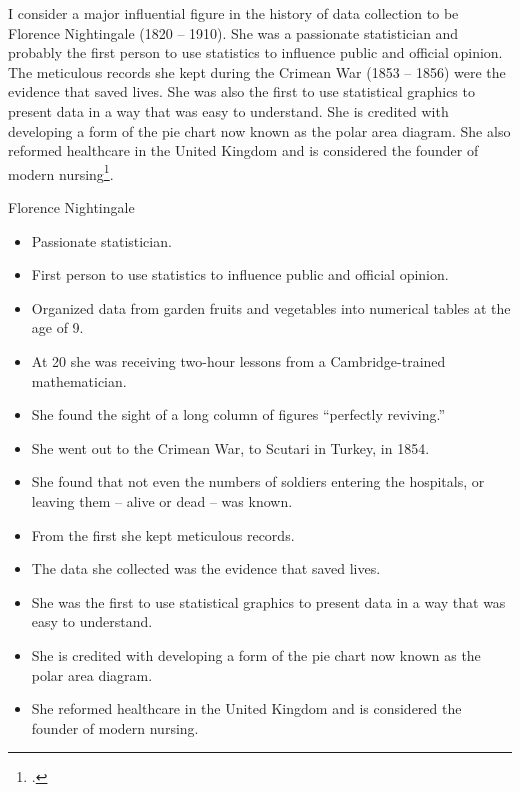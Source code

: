 I consider a major influential figure in the history of data
collection to be Florence Nightingale (1820 -- 1910).  She was a passionate statistician
and probably the first person to use statistics to influence public and official
opinion.  The meticulous records she kept during the Crimean War
(1853 -- 1856) were the evidence that saved lives.  She was also the first to use
statistical graphics to present data in a way that was easy to understand.  She is
credited with developing a form of the pie chart now known as the polar area
diagram.  She also reformed healthcare in the United Kingdom and
is considered the founder of modern nursing\footcite{Grajalez2013}.

\begin{mainbox}{Florence Nightingale}
  \begin{itemize}
    \item Passionate statistician.
    \item First person to use statistics to influence public and official opinion.
    \item Organized data from garden fruits and vegetables into numerical tables at the age of 9.
    \item At 20 she was receiving two-hour lessons from a Cambridge-trained mathematician.
    \item She found the sight of a long column of figures ``perfectly reviving.''
    \item She went out to the Crimean War, to Scutari in Turkey, in 1854.
    \item She found that not even the numbers of soldiers entering the hospitals, or leaving them – alive or dead – was known.
    \item From the first she kept meticulous records.
    \item The data she collected was the evidence that saved lives.
    \item She was the first to use statistical graphics to present data in a way that was easy to understand.
    \item She is credited with developing a form of the pie chart now known as the polar area diagram.
    \item She reformed healthcare in the United Kingdom and is considered the founder of modern nursing.
  \end{itemize}
\end{mainbox}

